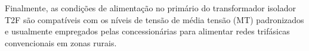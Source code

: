 \documentclass[oneside,openright,12pt]{ufsm_2021} %
\begin{document}
\par Finalmente, as condições de alimentação no primário do transformador isolador T2F são compatíveis com os níveis de tensão de média tensão (MT) padronizados e usualmente empregados pelas concessionárias para alimentar redes trifásicas convencionais em zonas rurais.




\startbibliography %

\end{document}
